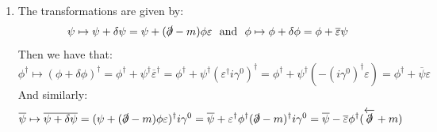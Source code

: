 \documentclass[10pt,a4paper]{article}
\begin{document}
\begin{enumerate}

\item The transformations are given by:
\[
\psi \mapsto \psi + \delta \psi = \psi + (\slashed{\partial} - m) \phi \varepsilon \mbox{~~and~~} \phi \mapsto \phi + \delta \phi = \phi + \overline{\varepsilon} \psi
\]
Then we have that:
\[
\phi^\dagger \mapsto (\phi + \delta \phi)^\dagger = \phi^\dagger + \psi^\dagger\overline{\varepsilon}^\dagger = \phi^\dagger + \psi^\dagger (\varepsilon^\dagger i \gamma^0)^\dagger  = \phi^\dagger + \psi^\dagger (- (i \gamma^0)^\dagger \varepsilon) = \phi^\dagger + \overline{\psi} \varepsilon
\]
And similarly:
\[
\overline{\psi} \mapsto \overline{\psi + \delta \psi} = (\psi + (\slashed{\partial} - m) \phi \varepsilon)^\dagger i \gamma^0 = \overline{\psi} + \varepsilon^\dagger \phi^\dagger (\slashed{\partial} - m)^\dagger i \gamma^0 = \overline{\psi} - \overline{\varepsilon} \phi^\dagger(\overleftarrow{\slashed{\partial}} + m)
\]


\end{enumerate}
\end{document}
